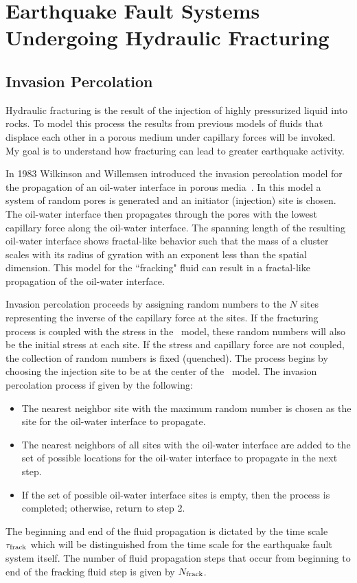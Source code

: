 
\chapter{\label{chp:frack}Earthquake Fault Systems Undergoing Hydraulic Fracturing}

\section{Invasion Percolation}

Hydraulic fracturing is the result of the injection of highly pressurized liquid into rocks. To model this process the results from previous models of fluids that displace each other in a porous medium under capillary forces will be invoked. My goal is to understand how fracturing can lead to greater earthquake activity.

In 1983 Wilkinson and Willemsen introduced the invasion percolation model for the propagation of an oil-water interface in porous media~\cite{wilk83}. In this model a system of random pores is generated and an initiator (injection) site is chosen. The oil-water interface then propagates through the pores with the lowest capillary force along the oil-water interface. The spanning length of the resulting oil-water interface shows fractal-like behavior such that the mass of a cluster scales with its radius of gyration  with an exponent less than the spatial dimension. This model for the ``fracking" fluid can result in a fractal-like propagation of the oil-water interface.

Invasion percolation proceeds by assigning random numbers to the $N$ sites  representing the inverse of the capillary force at the sites. If the  fracturing process is coupled with the stress in the \ofc\ model,  these random numbers  will also  be the initial   stress at each site. If the stress and capillary force are not coupled, the collection of random numbers is fixed (quenched). The process begins by choosing the injection site to be at the center of the \ofc\ model. The invasion percolation process if given by the following:
\begin{itemize}
	\item The nearest neighbor site with the maximum random number is chosen as the site for the oil-water interface to propagate.
	
	\item The nearest neighbors of all sites with the oil-water interface  are added to the set of possible locations for the oil-water interface to propagate in the next step.
		
	\item If the set of possible oil-water interface  sites is empty, then the process is completed; otherwise, return to step 2. 
\end{itemize}  
The beginning and end of the  fluid propagation is dictated by the  time scale $\tau_{\rm frack}$ which will be distinguished from the time scale for the earthquake fault system itself. The number of  fluid propagation steps that occur from beginning to end of the fracking fluid step is given by $N_{\rm frack}$.


